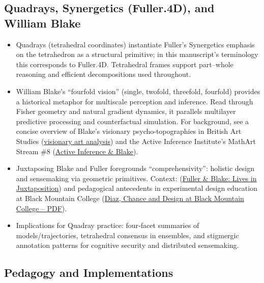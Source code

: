 \documentclass[
  10pt,
]{article}
\providecommand{\tightlist}{%
  \setlength{\itemsep}{0pt}\setlength{\parskip}{0pt}}
\begin{document}
\hypertarget{quadrays-synergetics-fuller.4d-and-william-blake}{%
\subsection{Quadrays, Synergetics (Fuller.4D), and William
Blake}\label{quadrays-synergetics-fuller.4d-and-william-blake}}

\begin{itemize}
\tightlist
\item
  Quadrays (tetrahedral coordinates) instantiate Fuller's Synergetics
  emphasis on the tetrahedron as a structural primitive; in this
  manuscript's terminology this corresponds to Fuller.4D. Tetrahedral
  frames support part--whole reasoning and efficient decompositions used
  throughout.
\item
  William Blake's ``fourfold vision'' (single, twofold, threefold,
  fourfold) provides a historical metaphor for multiscale perception and
  inference. Read through Fisher geometry and natural gradient dynamics,
  it parallels multilayer predictive processing and counterfactual
  simulation. For background, see a concise overview of Blake's
  visionary psycho‑topographies in British Art Studies
  (\href{https://www.britishartstudies.ac.uk/index/article-index/visionary-sense-of-london/article-category/cover-collaboration}{visionary
  art analysis}) and the Active Inference Institute's MathArt Stream \#8
  (\href{https://zenodo.org/records/13711302}{Active Inference \&
  Blake}).
\item
  Juxtaposing Blake and Fuller foregrounds ``comprehensivity'': holistic
  design and sensemaking via geometric primitives. Context:
  (\href{https://zenodo.org/records/7519132}{Fuller \& Blake: Lives in
  Juxtaposition}) and pedagogical antecedents in experimental design
  education at Black Mountain College
  (\href{https://commons.princeton.edu/eng574-s23/wp-content/uploads/sites/348/2023/03/Diaz-The-Experimenters-Chance-and-Design-at-Black-Mountain-College.pdf}{Diaz,
  Chance and Design at Black Mountain College -- PDF}).
\item
  Implications for Quadray practice: four‑facet summaries of
  models/trajectories, tetrahedral consensus in ensembles, and
  stigmergic annotation patterns for cognitive security and distributed
  sensemaking.
\end{itemize}

\hypertarget{pedagogy-and-implementations}{%
\subsection{Pedagogy and
Implementations}\label{pedagogy-and-implementations}}
\end{document}
